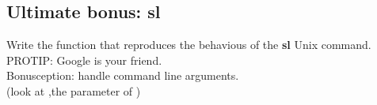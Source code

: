 \subsection{Ultimate bonus: sl}

Write the  function that reproduces the behavious of the \textbf{sl} Unix command.\\
PROTIP: Google is your friend.\\
Bonusception: handle command line arguments.\\
(look at ,the parameter of )
